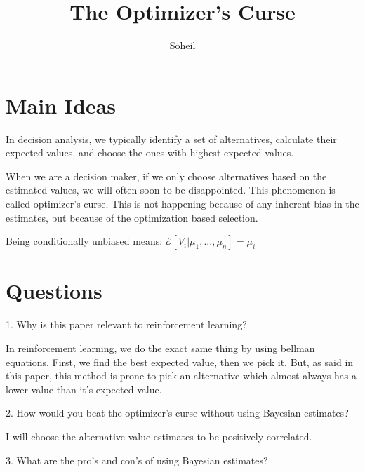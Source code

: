 \documentclass{article}
\title{The Optimizer's Curse}
\author{Soheil}
\date{}
\theoremstyle{remark}
\theoremstyle{remark}
\theoremstyle{remark}
\theoremstyle{remark}
\theoremstyle{remark}
\theoremstyle{remark}
\begin{document}
\maketitle
\section{Main Ideas}
In decision analysis, we typically identify a set of alternatives, calculate their expected values, and choose the ones with highest expected values.

When we are a decision maker, if we only choose alternatives based on the estimated values, we will often soon to be disappointed. This phenomenon is called optimizer's curse. This is not happening because of any inherent bias in the estimates, but because of the optimization based selection.


Being conditionally unbiased means:
$ \mathcal{E}[V_i | \mu_1, ..., \mu_n ] = \mu_i $

\section{Questions}

1. Why is this paper relevant to reinforcement learning?

In reinforcement learning, we do the exact same thing by using bellman equations. First, we find the best expected value, then we pick it. But, as said in this paper, this method is prone to pick an alternative which almost always has a lower value than it's expected value.

2. How would you beat the optimizer's curse without using Bayesian estimates?

I will choose the alternative value estimates to be positively correlated.


3. What are the pro's and con's of using Bayesian estimates?



\end{document}
